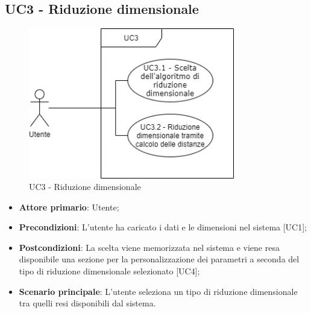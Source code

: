 \subsection{UC3 - Riduzione dimensionale}
\begin{figure}[h]
\includegraphics[width=9cm]{section/Images/UC3.png}
\centering
\caption{UC3 - Riduzione dimensionale}
\end{figure}
\begin{itemize}
	\item \textbf{Attore primario}: Utente;
	\item \textbf{Precondizioni}: L'utente ha caricato i dati e le dimensioni nel sistema [UC1];
	\item \textbf{Postcondizioni}: La scelta viene memorizzata nel sistema e viene resa disponibile una sezione per la personalizzazione dei parametri a seconda del tipo di riduzione dimensionale selezionato [UC4];
	\item \textbf{Scenario principale}: L'utente seleziona un tipo di riduzione dimensionale tra quelli resi disponibili dal sistema.
\end{itemize}